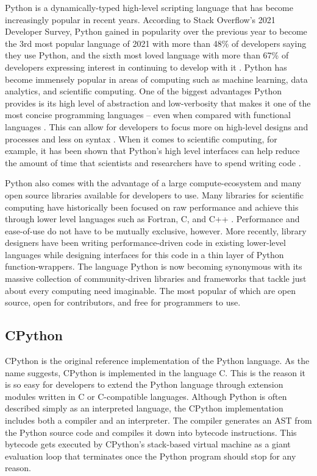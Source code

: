 Python is a dynamically-typed high-level scripting language that has become increasingly popular in recent years. According to Stack Overflow's 2021 Developer Survey, Python gained in popularity over the previous year to become the 3rd most popular language of 2021 with more than 48\% of developers saying they use Python, and the sixth most loved language with more than 67\% of developers expressing interest in continuing to develop with it \cite{soSurvey}. Python has become immensely popular in areas of computing such as machine learning, data analytics, and scientific computing. One of the biggest advantages Python provides is its high level of abstraction and low-verbosity that makes it one of the most concise programming languages -- even when compared with functional languages \cite{rosetta}. This can allow for developers to focus more on high-level designs and processes and less on syntax \cite{pycuda}. When it comes to scientific computing, for example, it has been shown that Python's high level interfaces can help reduce the amount of time that scientists and researchers have to spend writing code \cite{gpucomppy}. 

\quad Python also comes with the advantage of a large compute-ecosystem and many open source libraries available for developers to use. Many libraries for scientific computing have historically been focused on raw performance and achieve this through lower level languages such as Fortran, C, and C++ \cite{pythonEcosystem}. Performance and ease-of-use do not have to be mutually exclusive, however. More recently, library designers have been writing performance-driven code in existing lower-level languages while designing interfaces for this code in a thin layer of Python function-wrappers. The language Python is now becoming synonymous with its massive collection of community-driven libraries and frameworks that tackle just about every computing need imaginable. The most popular of which are open source, open for contributors, and free for programmers to use.



\subsection{CPython}

CPython is the original reference implementation of the Python language. As the name suggests, CPython is implemented in the language C. This is the reason it is so easy for developers to extend the Python language through extension modules written in C or C-compatible languages. Although Python is often described simply as an interpreted language, the CPython implementation includes both a compiler and an interpreter. The compiler generates an AST from the Python source code and compiles it down into bytecode instructions. This bytecode gets executed by CPython's stack-based virtual machine as a giant evaluation loop that terminates once the Python program should stop for any reason.

